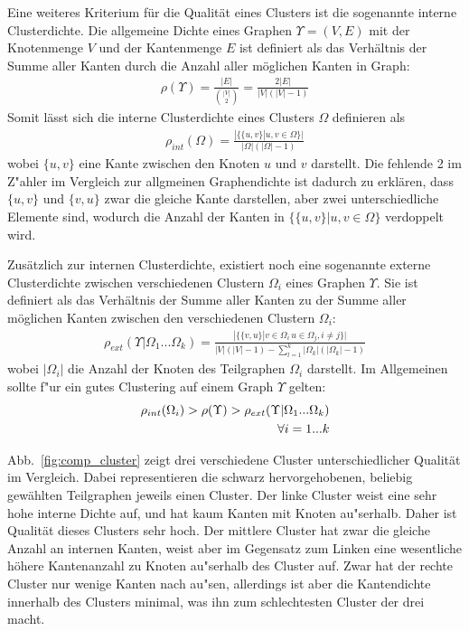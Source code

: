 \documentclass[journal]{vgtc}
\begin{document}
  Eine weiteres Kriterium für die Qualität eines Clusters ist die sogenannte interne Clusterdichte.
  Die allgemeine Dichte eines Graphen $\Upsilon = (V,E)$ mit der Knotenmenge $V$ und der Kantenmenge
  $E$ ist definiert als das Verhältnis der Summe aller Kanten durch die Anzahl aller 
  möglichen Kanten in Graph:
    \begin{align}
      \rho(\Upsilon) = \frac{|E|}{\binom{|V|}{2}} = \frac{2|E|}{|V|(|V|-1)}
    \end{align}
  Somit lässt sich die interne Clusterdichte eines Clusters $\Omega$ definieren als
    \begin{align}
      \rho_{int}(\Omega) = \frac{|\{\{u,v\} |u,v \in \Omega \}|}{|\Omega|(|\Omega|-1)}
    \end{align}
  wobei $\{u,v\}$ eine Kante zwischen den Knoten $u$ und $v$ darstellt. Die fehlende 2 im Z"ahler
  im Vergleich zur allgmeinen Graphendichte ist dadurch zu erklären, dass $\{u,v\}$ und $\{v,u\}$ 
  zwar die gleiche Kante darstellen, aber zwei unterschiedliche Elemente sind, wodurch die Anzahl
  der Kanten in $\{\{u,v\} |u,v \in \Omega \}$ verdoppelt wird.
  
  Zusätzlich zur internen Clusterdichte, existiert noch eine sogenannte externe Clusterdichte 
  zwischen verschiedenen Clustern $\Omega_i$ eines Graphen $\Upsilon$. Sie ist definiert als
  das Verhältnis der Summe aller Kanten zu der Summe aller möglichen Kanten zwischen den
  verschiedenen Clustern $\Omega_i$:
    \begin{align}
      \rho_{ext}(\Upsilon|\Omega_1 ... \Omega_k) = \frac{|\{\{v,u\} | v\in \Omega_i\, u \in \Omega_j, i \neq j\}|}
                                                        {|V|(|V|-1)-\sum\limits_{l=1}^k |\Omega_k|(|\Omega_k|-1)}
    \end{align}
  wobei $|\Omega_i|$ die Anzahl der Knoten des Teilgraphen $\Omega_i$ darstellt.
  Im Allgemeinen sollte f"ur ein gutes Clustering auf einem Graph $\Upsilon$ gelten:
    \begin{align}
      \rho_{int}(\Omega_i) > \rho(\Upsilon) > \rho_{ext}(\Upsilon|\Omega_1 ... \Omega_k) \\ 
      			\forall i=1...k \notag
    \end{align}
  
  Abb.~\ref{fig:comp_cluster} zeigt drei verschiedene Cluster unterschiedlicher Qualität im Vergleich.
  Dabei representieren die schwarz hervorgehobenen, beliebig gewählten Teilgraphen jeweils 
  einen Cluster. Der linke Cluster weist eine sehr hohe interne
  Dichte auf, und hat kaum Kanten mit Knoten au"serhalb. Daher ist Qualität dieses Clusters
  sehr hoch. Der mittlere Cluster hat zwar die gleiche Anzahl an internen Kanten, weist
  aber im Gegensatz zum Linken eine wesentliche höhere Kantenanzahl zu Knoten au"serhalb des
  Cluster auf. Zwar hat der rechte Cluster nur wenige Kanten nach au"sen, allerdings ist aber
  die Kantendichte innerhalb des Clusters minimal, was ihn zum schlechtesten Cluster der drei macht.
\end{document}
